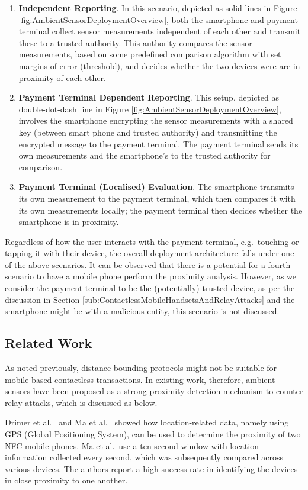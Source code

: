 \documentclass{article}
\begin{document}
\begin{enumerate}
\item \textbf{Independent Reporting}.  In this scenario, depicted as solid lines in Figure \ref{fig:AmbientSensorDeploymentOverview}, both the smartphone and payment terminal collect sensor measurements independent of each other and transmit these to a trusted authority.  This authority compares the sensor measurements, based on some predefined comparison algorithm with set margins of error (threshold), and decides whether the two devices were are in proximity of each other.
\item \textbf{Payment Terminal Dependent Reporting}.  This setup, depicted as double-dot-dash line in Figure \ref{fig:AmbientSensorDeploymentOverview}, involves the smartphone encrypting the sensor measurements with a shared key (between smart phone and trusted authority) and transmitting the encrypted message to the payment terminal.  The payment terminal sends its own measurements and the smartphone's to the trusted authority for comparison.
\item \textbf{Payment Terminal (Localised) Evaluation}.  The smartphone transmits its own measurement to the payment terminal, which then compares it with its own measurements locally; the payment terminal then decides whether the smartphone is in proximity. 
\end{enumerate}

Regardless of how the user interacts with the payment terminal, e.g.\ touching or tapping it with their device, the overall deployment architecture falls under one of the above scenarios.  It can be observed that there is a potential for a fourth scenario to have a mobile phone perform the proximity analysis.  However, as we consider the payment terminal to be the (potentially) trusted device, as per the discussion in Section \ref{sub:ContactlessMobileHandsetsAndRelayAttacks} and the smartphone might be with a malicious entity, this scenario is not discussed.

\subsection{Related Work}
\label{sec:RelatedWork}
As noted previously, distance bounding protocols might not be suitable for mobile based contactless transactions.  In existing work, therefore, ambient sensors have been proposed as a strong proximity detection mechanism to counter relay attacks, which is discussed as below.

Drimer et al.\ \cite{DrimerM07} and Ma et al.\ \cite{6378376} showed how location-related data, namely using GPS (Global Positioning System), can be used to determine the proximity of two NFC mobile phones.  Ma et al.\ use a ten second window with location information collected every second, which was subsequently compared across various devices.  The authors report a high success rate in identifying the devices in close proximity to one another.
\end{document}
